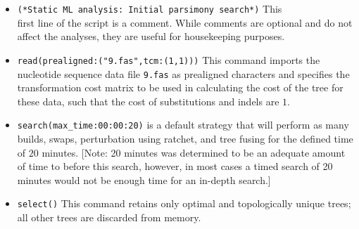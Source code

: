 \begin{itemize}
\item \texttt{(*Static ML analysis: Initial parsimony search*)}
This \\ first line of the script is a comment. While comments are
optional and do not affect the analyses, they are useful for
housekeeping purposes.  
\item \texttt{read(prealigned:("9.fas",tcm:(1,1)))}
This command imports the nucleotide sequence data file \texttt{9.fas}
as prealigned characters and specifies the transformation cost
matrix to be used in calculating the cost of the tree for these
data, such that the cost of substitutions and indels are $1$.  
\item \texttt{search(max\_time:00:00:20)}  is a default
strategy that will perform as many builds, swaps,  perturbation
using ratchet, and tree fusing for the defined time of $ 20 $
minutes. [Note: 20 minutes was determined to be an adequate amount
of time to before this search, however, in most cases a timed search
of 20 minutes would not be enough time for an in-depth search.]
\item \texttt{select()} This command retains only optimal and
topologically unique trees; all other trees are discarded from
memory.  


\end{itemize}
